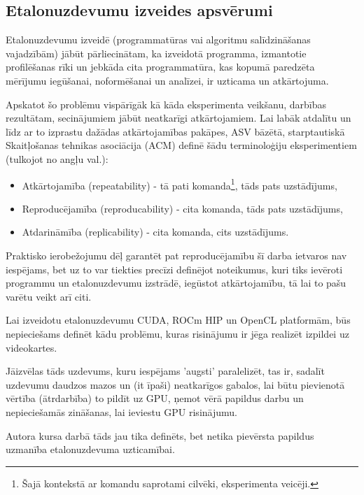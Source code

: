 \begin{center}
    \chapter{Etalonuzdevumu izveides apsvērumi}
\end{center}

Etalonuzdevumu izveidē (programmatūras vai algoritmu salīdzināšanas vajadzībām)
jābūt pārliecinātam, ka izveidotā programma, izmantotie profilēšanas rīki un
jebkāda cita programmatūra, kas kopumā paredzēta mērījumu iegūšanai,
noformēšanai un analīzei, ir uzticama un atkārtojuma.

Apskatot šo problēmu vispārīgāk kā kāda eksperimenta veikšanu, darbības
rezultātam, secinājumiem jābūt neatkarīgi atkārtojamiem. Lai labāk atdalītu un
līdz ar to izprastu dažādas atkārtojamības pakāpes, ASV bāzētā, starptautiskā
Skaitļošanas tehnikas asociācija (ACM) definē šādu terminoloģiju eksperimentiem
(tulkojot no angļu val.):
\cite{acm-experiment-terms}

\begin{itemize}
    \item Atkārtojamība (repeatability) - tā pati komanda\footnote{Šajā
        kontekstā ar komandu saprotami cilvēki, eksperimenta veicēji.}, tāds
        pats uzstādījums,
    \item Reproducējamība (reproducability) - cita komanda, tāds pats
        uzstādījums,
    \item Atdarināmība (replicability) -  cita komanda, cits uzstādījums.
\end{itemize}


Praktisko ierobežojumu dēļ garantēt pat reproducējamību šī darba ietvaros nav
iespējams, bet uz to var tiekties precīzi definējot noteikumus, kuri tiks
ievēroti programmu un etalonuzdevumu izstrādē, iegūstot atkārtojamību, tā lai
to pašu varētu veikt arī citi.

Lai izveidotu etalonuzdevumu CUDA, ROCm HIP un OpenCL platformām,
būs nepieciešams definēt kādu problēmu, kuras risinājumu ir jēga realizēt
izpildei uz videokartes.

Jāizvēlas tāds uzdevums, kuru iespējams 'augsti' paralelizēt, tas ir, sadalīt
uzdevumu daudzos mazos un (it īpaši) neatkarīgos gabalos, lai būtu pievienotā
vērtība (ātrdarbība) to pildīt uz GPU, ņemot vērā papildus darbu un
nepieciešamās zināšanas, lai ieviestu GPU risinājumu.

Autora kursa darbā\cite{kursa-darbs} tāds jau tika definēts, bet netika
pievērsta papildus uzmanība etalonuzdevuma uzticamībai.

